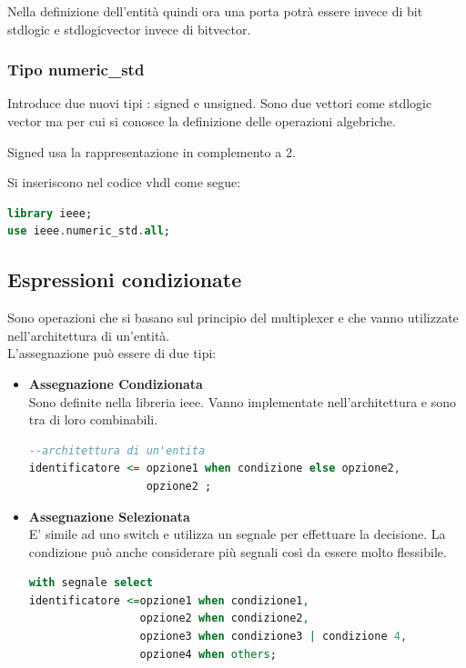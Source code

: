 \documentclass[a4paper]{book}
\begin{document}
Nella definizione dell'entità quindi ora una porta potrà essere invece di bit std\textunderscore logic e std\textunderscore logic\textunderscore vector invece di bit\textunderscore vector.

\subsubsection{Tipo numeric\_std}

Introduce due nuovi tipi : signed e unsigned.
Sono due vettori come std\textunderscore logic \textunderscore vector ma per cui si conosce la definizione delle operazioni algebriche.

Signed usa la rappresentazione in complemento a 2.


Si inseriscono nel codice vhdl come segue:

\begin{lstlisting}[language=VHDL]
library ieee;
use ieee.numeric_std.all;
\end{lstlisting}




\subsection{Espressioni condizionate}

Sono operazioni che si basano sul principio del multiplexer e che vanno utilizzate nell'architettura di un'entità.\\
L'assegnazione può essere di due tipi:

\begin{itemize}
\item\textbf{Assegnazione Condizionata}\\
Sono definite nella libreria ieee.
Vanno implementate nell'architettura e sono tra di loro combinabili.
\begin{lstlisting}[language = VHDL]
--architettura di un'entita
identificatore <= opzione1 when condizione else opzione2,
                  opzione2 ;
\end{lstlisting}
\item\textbf{Assegnazione Selezionata}\\
E' simile ad uno switch e utilizza un segnale per effettuare la decisione.
La condizione può anche considerare più segnali così da essere molto flessibile.

\begin{lstlisting}[language=VHDL]
with segnale select
identificatore <=opzione1 when condizione1,
                 opzione2 when condizione2,
                 opzione3 when condizione3 | condizione 4,
                 opzione4 when others;
\end{lstlisting}
\end{itemize}
\end{document}
